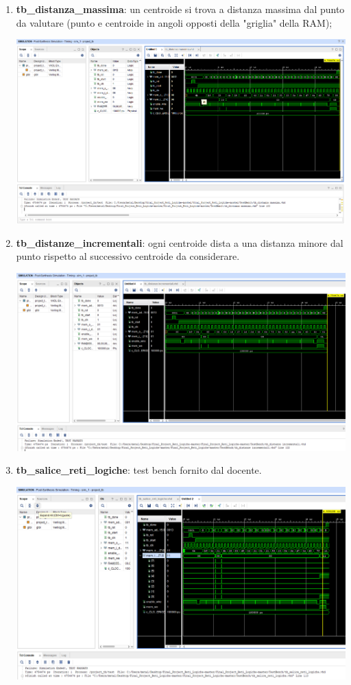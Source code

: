 \documentclass[a4paper,12pt]{article}
\begin{document}
\begin{enumerate}
\item \textbf{tb\_distanza\_massima}: un centroide si trova a distanza massima dal punto da valutare (punto e centroide in angoli opposti della "griglia" della RAM);

\includegraphics[scale=0.32]{images/tb_distanza_massima}

\newpage
\item \textbf{tb\_distanze\_incrementali}: ogni centroide dista a una distanza minore dal punto rispetto al successivo centroide da considerare.

\includegraphics[scale=0.32]{images/tb_distanze_incrementali}

\item \textbf{tb\_salice\_reti\_logiche}: test bench fornito dal docente.

\includegraphics[scale=0.32]{images/tb_salice_reti_logiche}

\end{enumerate}
\end{document}
